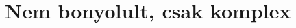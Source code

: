 \documentclass[12pt]{book}
\theoremstyle{plain} %
\theoremstyle{definition} %
\newtheorem{theo/}{Tétel}[section]
\newenvironment{theo}
  {\renewcommand{\qedsymbol}{$\clubsuit$}%
   \pushQED{\qed}\begin{theo/}}
  {\popQED\end{theo/}}
\theoremstyle{remark}
\renewcommand\qedsymbol{$\blacksquare$}
\numberwithin{equation}{section}  %
\def\R{\mathbb{R}}
\def\C{\mathbb{C}}
\begin{document}
	\section{Nem bonyolult, csak komplex}

\end{document}
